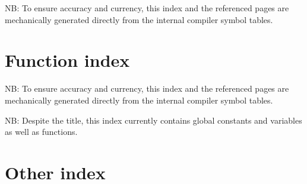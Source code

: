 {\sc NB:} To ensure accuracy and currency, this index and the referenced 
pages are mechanically generated directly from the internal 
compiler symbol tables.

\printindex[pkg]
\cutend*



\section{Function index}


{\sc NB:} To ensure accuracy and currency, this index and the referenced 
pages are mechanically generated directly from the internal 
compiler symbol tables.

{\sc NB:} Despite the title, this index currently contains global 
constants and variables as well as functions.

\printindex[fun]
\cutend*



\section{Other index}

\printindex[etc]
\cutend*



